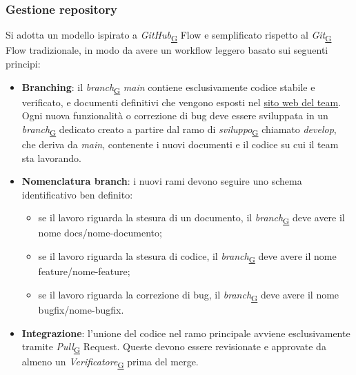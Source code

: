 \documentclass[a4paper,12pt]{article}
\begin{document}
        \subsubsection{Gestione repository}
            Si adotta un modello ispirato a \textit{GitHub}\textsubscript{\href{https://atlasteam9.github.io/Atlas/glossario.html\#GitHub}{G}} Flow e semplificato rispetto al \textit{Git}\textsubscript{\href{https://atlasteam9.github.io/Atlas/glossario.html\#Git}{G}} Flow tradizionale, in modo da avere un workflow leggero basato sui seguenti principi:
            \begin{itemize}
                \item \textbf{Branching}: il \textit{branch}\textsubscript{\href{https://atlasteam9.github.io/Atlas/glossario.html\#Branch}{G}} \textit{main} contiene esclusivamente codice stabile e verificato, e documenti definitivi che vengono esposti nel \href{https://atlasteam9.github.io/Atlas/}{sito web del team}. Ogni nuova funzionalità o correzione di bug deve essere sviluppata in un \textit{branch}\textsubscript{\href{https://atlasteam9.github.io/Atlas/glossario.html\#Branch}{G}} dedicato creato a partire dal ramo di \textit{sviluppo}\textsubscript{\href{https://atlasteam9.github.io/Atlas/glossario.html\#Sviluppo}{G}} chiamato \textit{develop}, che deriva da \textit{main}, contenente i nuovi documenti e il codice su cui il team sta lavorando. 
                \item \textbf{Nomenclatura branch}: i nuovi rami devono seguire uno schema identificativo ben definito:
                \begin{itemize}
                    \item se il lavoro riguarda la stesura di un documento, il \textit{branch}\textsubscript{\href{https://atlasteam9.github.io/Atlas/glossario.html\#Branch}{G}} deve avere il nome docs/nome-documento;
                    \item se il lavoro riguarda la stesura di codice, il \textit{branch}\textsubscript{\href{https://atlasteam9.github.io/Atlas/glossario.html\#Branch}{G}} deve avere il nome feature/nome-feature;
                    \item se il lavoro riguarda la correzione di bug, il \textit{branch}\textsubscript{\href{https://atlasteam9.github.io/Atlas/glossario.html\#Branch}{G}} deve avere il nome bugfix/nome-bugfix.
                \end{itemize}
                \item \textbf{Integrazione}: l'unione del codice nel ramo principale avviene esclusivamente tramite \textit{Pull}\textsubscript{\href{https://atlasteam9.github.io/Atlas/glossario.html\#Pull}{G}} Request. Queste devono essere revisionate e approvate da almeno un \textit{Verificatore}\textsubscript{\href{https://atlasteam9.github.io/Atlas/glossario.html\#Verificatore}{G}} prima del merge.

\end{itemize}
\end{document}
